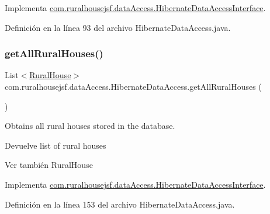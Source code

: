 Implementa \mbox{\hyperlink{interfacecom_1_1ruralhousejsf_1_1data_access_1_1_hibernate_data_access_interface_a4c8bc4e3b076f4fc75efb878cc2c1c21}{com.\+ruralhousejsf.\+data\+Access.\+Hibernate\+Data\+Access\+Interface}}.



Definición en la línea 93 del archivo Hibernate\+Data\+Access.\+java.

\mbox{\label{classcom_1_1ruralhousejsf_1_1data_access_1_1_hibernate_data_access_acb92be47dc680218ff3102addce8ae8f}} 
\subsubsection{\texorpdfstring{getAllRuralHouses()}{getAllRuralHouses()}}
{\footnotesize\ttfamily List$<$\mbox{\hyperlink{classcom_1_1ruralhousejsf_1_1domain_1_1_rural_house}{Rural\+House}}$>$ com.\+ruralhousejsf.\+data\+Access.\+Hibernate\+Data\+Access.\+get\+All\+Rural\+Houses (\begin{DoxyParamCaption}{ }\end{DoxyParamCaption})}

Obtains all rural houses stored in the database.

\begin{DoxyReturn}{Devuelve}
list of rural houses
\end{DoxyReturn}
\begin{DoxySeeAlso}{Ver también}
Rural\+House 
\end{DoxySeeAlso}


Implementa \mbox{\hyperlink{interfacecom_1_1ruralhousejsf_1_1data_access_1_1_hibernate_data_access_interface_a1cdfce6d8d91e481887b364000fbf6d0}{com.\+ruralhousejsf.\+data\+Access.\+Hibernate\+Data\+Access\+Interface}}.



Definición en la línea 153 del archivo Hibernate\+Data\+Access.\+java.

\mbox{\label{classcom_1_1ruralhousejsf_1_1data_access_1_1_hibernate_data_access_a6df6a0502595b73be0f6d238743eeda5}} 
